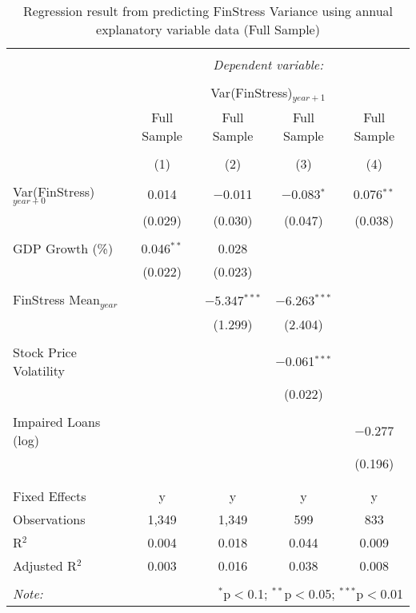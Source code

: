 
\begin{table}[!htbp] \centering 
  \caption{Regression result from predicting FinStress Variance using annual explanatory variable data (Full Sample)} 
  \label{annual_reg} 
\tiny 
\begin{tabular}{@{\extracolsep{5pt}}lcccc} 
\\[-1.8ex]\hline 
\hline \\[-1.8ex] 
 & \multicolumn{4}{c}{\textit{Dependent variable:}} \\ 
\cline{2-5} 
\\[-1.8ex] & \multicolumn{4}{c}{Var(FinStress)$_{year+1}$} \\ 
 & Full Sample & Full Sample & Full Sample & Full Sample \\ 
\\[-1.8ex] & (1) & (2) & (3) & (4)\\ 
\hline \\[-1.8ex] 
 Var(FinStress)$_{year+0}$ & 0.014 & $-$0.011 & $-$0.083$^{*}$ & 0.076$^{**}$ \\ 
  & (0.029) & (0.030) & (0.047) & (0.038) \\ 
  & & & & \\ 
 GDP Growth (\%) & 0.046$^{**}$ & 0.028 &  &  \\ 
  & (0.022) & (0.023) &  &  \\ 
  & & & & \\ 
 FinStress Mean$_{year}$ &  & $-$5.347$^{***}$ & $-$6.263$^{***}$ &  \\ 
  &  & (1.299) & (2.404) &  \\ 
  & & & & \\ 
 Stock Price Volatility &  &  & $-$0.061$^{***}$ &  \\ 
  &  &  & (0.022) &  \\ 
  & & & & \\ 
 Impaired Loans (log) &  &  &  & $-$0.277 \\ 
  &  &  &  & (0.196) \\ 
  & & & & \\ 
\hline \\[-1.8ex] 
Fixed Effects & y & y & y & y \\ 
Observations & 1,349 & 1,349 & 599 & 833 \\ 
R$^{2}$ & 0.004 & 0.018 & 0.044 & 0.009 \\ 
Adjusted R$^{2}$ & 0.003 & 0.016 & 0.038 & 0.008 \\ 
\hline 
\hline \\[-1.8ex] 
\textit{Note:}  & \multicolumn{4}{r}{$^{*}$p$<$0.1; $^{**}$p$<$0.05; $^{***}$p$<$0.01} \\ 
\end{tabular} 
\end{table} 
